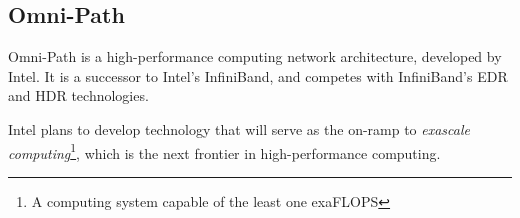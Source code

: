 \subsection{Omni-Path}
Omni-Path is a high-performance computing network architecture, developed by Intel. It is a successor to Intel's InfiniBand, and competes with InfiniBand's EDR and HDR technologies.

Intel plans to develop technology that will serve as the on-ramp to \textit{exascale computing}\footnote{A computing system capable of the least one exaFLOPS}, which is the next frontier in high-performance computing.

